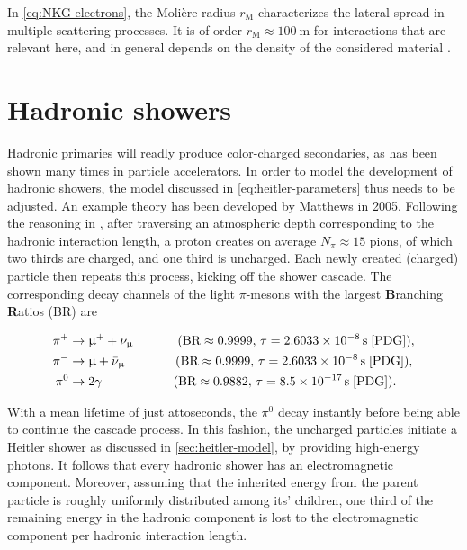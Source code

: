 In \autoref{eq:NKG-electrons}, the Molière radius $r_\text{M}$ characterizes the lateral spread in multiple scattering processes. It is of order 
$r_\text{M}\approx\SI{100}{\meter}$ for interactions that are relevant here, and in general depends on the density of the considered material 
\cite{moliere1947theorie}.

\section{Hadronic showers}
\label{sec:heitler-matthews-model}

Hadronic primaries will readly produce color-charged secondaries, as has been shown many times in particle accelerators. In order to model the development of 
hadronic showers, the model discussed in \autoref{eq:heitler-parameters} thus needs to be adjusted. An example theory has been developed by Matthews in 2005. 
Following the reasoning in \cite{matthews2005heitler}, after traversing an atmospheric depth corresponding to the hadronic interaction length, a proton creates on 
average $N_\pi \approx 15$ pions, of which two thirds are charged, and one third is uncharged. Each newly created (charged) particle then repeats this process, 
kicking off the shower cascade. The corresponding decay channels of the light $\pi$-mesons with the largest \textbf{B}ranching \textbf{R}atios (BR) are 

\begin{align*}
	\pi^{+} &\rightarrow \upmu^{+} + \nu_\upmu \!\!\!  \qquad\qquad (\text{BR}\approx0.9999,\,\tau=\SI{2.6033e-8}{\second} \; \text{\cite{PDG}}), \\
	\pi^{-} &\rightarrow \upmu + \bar{\nu}_\upmu \qquad\qquad (\text{BR}\approx0.9999,\,\tau=\SI{2.6033e-8}{\second} \; \text{\cite{PDG}}), \\
	\pi^0 &\rightarrow 2\gamma \!\! \qquad\qquad\qquad (\text{BR}\approx0.9882,\,\tau=\SI{8.5e-17}{\second}\; \text{\cite{PDG}}).
\end{align*}

With a mean lifetime of just attoseconds, the $\pi^0$ decay instantly before being able to continue the cascade process. In this fashion, the uncharged particles 
initiate a Heitler shower as discussed in \autoref{sec:heitler-model}, by providing high-energy photons. It follows that every hadronic shower has an electromagnetic 
component. Moreover, assuming that the inherited energy from the parent particle is roughly uniformly distributed among its' children, one third of the remaining
energy in the hadronic component is lost to the electromagnetic component per hadronic interaction length. 

